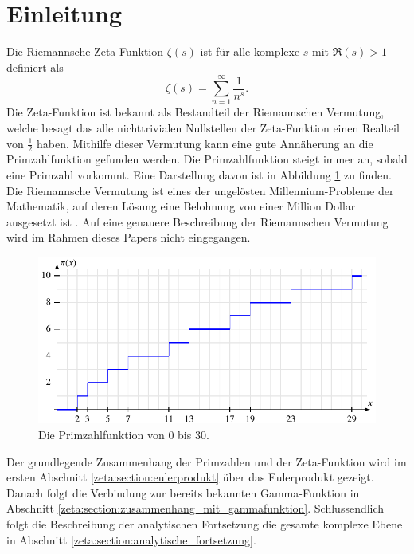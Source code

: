 \section{Einleitung} \label{zeta:section:einleitung}

Die Riemannsche Zeta-Funktion $\zeta(s)$ ist für alle komplexe $s$ mit $\Re(s) > 1$ definiert als
%
\begin{equation}\label{zeta:equation1}
    \zeta(s)
    =
    \sum_{n=1}^{\infty}
    \frac{1}{n^s}.
\end{equation}
Die Zeta-Funktion ist bekannt als Bestandteil der Riemannschen Vermutung, welche besagt das alle nichttrivialen Nullstellen der Zeta-Funktion einen Realteil von $\frac{1}{2}$ haben.
%
Mithilfe dieser Vermutung kann eine gute Annäherung an die Primzahlfunktion gefunden werden.
%
Die Primzahlfunktion steigt immer an, sobald eine Primzahl vorkommt.
Eine Darstellung davon ist in Abbildung \ref{fig:zeta:primzahlfunktion} zu finden.
Die Riemannsche Vermutung ist eines der ungelösten Millennium-Probleme der Mathematik, auf deren Lösung eine Belohnung von einer Million Dollar ausgesetzt ist \cite{zeta:online:millennium}.
%
Auf eine genauere Beschreibung der Riemannschen Vermutung wird im Rahmen dieses Papers nicht eingegangen.
\begin{figure}
    \centering
%    
    \includegraphics{papers/zeta/images/primzahlfunktion2.pdf}
    \caption{Die Primzahlfunktion von $0$ bis $30$.}
    \label{fig:zeta:primzahlfunktion}
\end{figure}

Der grundlegende Zusammenhang der Primzahlen und der Zeta-Funktion wird im ersten Abschnitt \ref{zeta:section:eulerprodukt} über das Eulerprodukt gezeigt.
%
%
Danach folgt die Verbindung zur bereits bekannten Gamma-Funktion in Abschnitt \ref{zeta:section:zusammenhang_mit_gammafunktion}.
Schlussendlich folgt die Beschreibung der analytischen Fortsetzung die gesamte komplexe Ebene in Abschnitt \ref{zeta:section:analytische_fortsetzung}.

